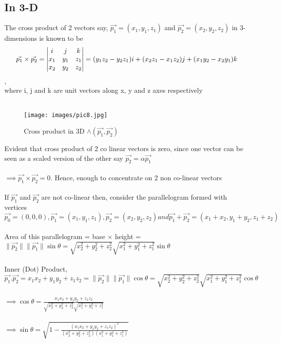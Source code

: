 \documentclass{article}
\newcommand\ddfrac[2]{\frac{\displaystyle #1}{\displaystyle #2}}
\begin{document}
    \subsection{In 3-D}
    The cross product of 2 vectors say, $\Vec{p_1}=(x_1,y_1,z_1)$ and $\Vec{p_2}=(x_2,y_2,z_2)$ in 3-dimensions is known to be $$ \Vec{p_1} \times \Vec{p_2} = \mdet{i & j & k\\ x_1 & y_1 & z_1 \\ x_2 & y_2 & z_2} = (y_1z_2 - y_2z_1)i + (x_2z_1 - x_1z_2)j + (x_1y_2 - x_2y_1)k$$, \\
    where i, j and k are unit vectors along x, y and z axes respectively \\ \\
    \begin{figure}[h]
    \caption{Cross product in 3D $\land (\Vec{p_1},\Vec{p_2})$}
    \centering
    \texttt{[image: images/pic8.jpg]}
    \end{figure}
    Evident that cross product of 2 co linear vectors is zero, since one vector can be seen as a scaled version of the other say $\Vec{p_2}= \alpha \Vec{p_1}$ \\ \\
    $\implies \Vec{p_1} \times \Vec{p_2} = 0 $. Hence, enough to concentrate on 2 non co-linear vectors\\ \\
    If $\Vec{p_1}$ and $\Vec{p_2}$ are not co-linear then, consider the parallelogram formed with vertices $\Vec{p_0}=(0,0,0), \Vec{p_1}=(x_1,y_1,z_1), \Vec{p_2}=(x_2,y_2,z_2) and \Vec{p_1} + \Vec{p_2} = (x_1 + x_2,y_1 + y_2,z_1 + z_2)  $ \\ \\
    Area of this parallelogram = base $\times$ height = $ 	\lVert \Vec{p_2} \rVert \lVert \Vec{p_1} \rVert \sin{\theta} = \sqrt{x_2^2 + y_2^2 + z_2^2} \sqrt{x_1^2 + y_1^2 + z_1^2} \sin{\theta}$ \\ \\
    Inner (Dot) Product, $\Vec{p_1} . \Vec{p_2} = x_1x_2 + y_1y_2 + z_1z_2 = \lVert \Vec{p_2} \rVert \lVert \Vec{p_1} \rVert \cos{\theta} = \sqrt{x_2^2 + y_2^2 + z_2^2} \sqrt{x_1^2 + y_1^2 + z_1^2} \cos{\theta}$ \\ \\
    $\implies \cos{\theta} = \ddfrac{x_1x_2 + y_1y_2 + z_1z_2}{\sqrt{x_2^2 + y_2^2 + z_2^2} \sqrt{x_1^2 + y_1^2 + z_1^2}}$ \\ \\
    $\implies \sin{\theta} = \sqrt{1 - \ddfrac{(x_1x_2 + y_1y_2 + z_1z_2)^2}{(x_2^2 + y_2^2 + z_2^2)(x_1^2 + y_1^2 + z_1^2)}}$ \\ \\
\end{document}

